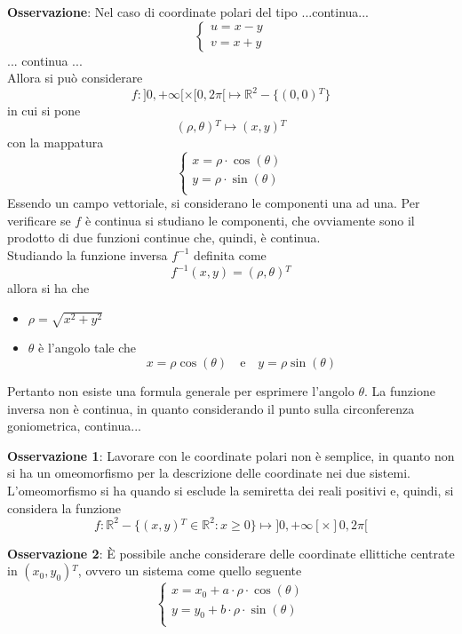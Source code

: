 \documentclass[a4paper]{extarticle}
\begin{document}
\vspace{1em}
\noindent
\textbf{Osservazione}: Nel caso di coordinate polari del tipo ...continua...
\[
    \left\{
    \begin{array}{l}
        u=x-y\\
        v=x+y
    \end{array}  
    \right.
\]
... continua ...\\
Allora si può considerare
\[f : ]0,+\infty[ \times [0,2\pi[ \longmapsto \mathbb{R}^2 - \{(0,0){^T}\}\]
in cui si pone
\[(\rho,\theta){^T} \longmapsto (x,y){^T}\]
con la mappatura 
\[
    \left\{
    \begin{array}{l}
        x=\rho \cdot \cos(\theta)\\
        y=\rho \cdot \sin(\theta)\\
    \end{array}  
    \right.
\]
Essendo un campo vettoriale, si considerano le componenti una ad una. Per verificare se $f$ è continua si studiano le componenti, che ovviamente sono il prodotto di due funzioni continue che, quindi, è continua.\\
Studiando la funzione inversa $f^{-1}$ definita come
\[f^{-1}(x,y) = (\rho,\theta){^T}\]
allora si ha che
\begin{itemize}
    \item $\rho=\sqrt{x^2+y^2}$
    \item $\theta$ è l'angolo tale che
    \[x=\rho \cos(\theta) \hspace{1em} \text{e} \hspace{1em} y=\rho \sin(\theta)\]
\end{itemize}
Pertanto non esiste una formula generale per esprimere l'angolo $\theta$. La funzione inversa non è continua, in quanto considerando il punto sulla circonferenza goniometrica, continua...

\vspace{1em}
\noindent
\textbf{Osservazione 1}: Lavorare con le coordinate polari non è semplice, in quanto non si ha un omeomorfismo per la descrizione delle coordinate nei due sistemi. L'omeomorfismo si ha quando si esclude la semiretta dei reali positivi e, quindi, si considera la funzione
\[f : \mathbb{R}^2 - \{(x,y){^T} \in \mathbb{R}^2 : x \geq 0\} \longmapsto ]0,+\infty[ \times ]0,2\pi[\]

\vspace{1em}
\noindent
\textbf{Osservazione 2}: È possibile anche considerare delle coordinate ellittiche centrate in $(x_0,y_0){^T}$, ovvero un sistema come quello seguente
\[
\left\{
    \begin{array}{l}
        x=x_0 + a \cdot \rho \cdot \cos(\theta)\\
        y=y_0 + b \cdot \rho \cdot \sin(\theta)\\
    \end{array}  
    \right.
\]
\end{document}
